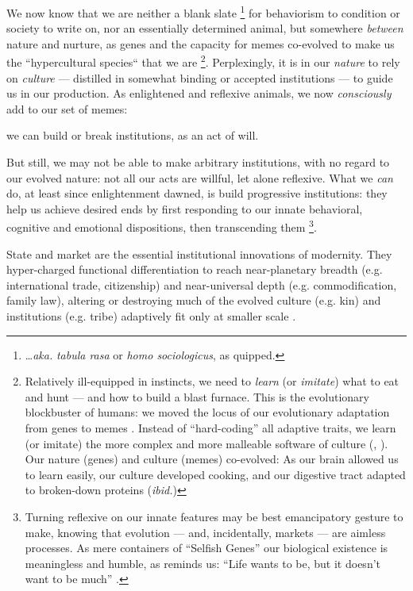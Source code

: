 \documentclass[11pt,a4paper,oneside,openright]{article}
\begin{document}
\begin{enumerate}
	We now know that we are neither a blank slate
		\footnote{
			\ldots \emph{aka.} \emph{tabula rasa} or \emph{homo sociologicus}, as \cite{Dahrendorf1965} quipped.
		} 
	for behaviorism to condition or society to write on, nor an essentially determined animal, but somewhere \emph{between} nature and nurture, as genes and the capacity for memes \citep{Dawkins1976} co-evolved to make us the ``hypercultural species`` that we are  \citep[loc 175]{Henrich2007}
	\footnote{
		Relatively ill-equipped in instincts, we need to \emph{learn} (or \emph{imitate}) what to eat and hunt --- and how to build a blast furnace. 
		This is the evolutionary blockbuster of humans: 
		we moved the locus of our evolutionary adaptation from genes to memes \citep{Dawkins1976}. 
		Instead of ``hard-coding'' all adaptive traits, we learn (or imitate) the more complex and more malleable software of culture (\citealt{Boyd1985}, \citealt[K 196ff]{Henrich2007}). 
		Our nature (genes) and culture (memes) co-evolved: 
		As our brain allowed us to learn easily, our culture developed cooking, and our digestive tract adapted to broken-down proteins (\emph{ibid.})
	}. 
	Perplexingly, it is in our \emph{nature} to rely on \emph{culture}  --- distilled in somewhat binding or accepted institutions --- to guide us in our production. 
	As enlightened and reflexive animals, we now \emph{consciously} add to our set of memes: 
	
	we can build or break institutions, as an act of will. 
	
	But still, we may not be able to make arbitrary institutions, with no regard to our evolved nature: 
	not all our acts are willful, let alone reflexive. 
	What we \emph{can} do, at least since enlightenment dawned, is build progressive institutions: 
	they help us achieve desired ends by first responding to our innate behavioral, cognitive and emotional dispositions, then transcending them
		\footnote{
			Turning reflexive on our innate features may be best emancipatory gesture to make, knowing that evolution --- and, incidentally, markets --- are aimless processes. 
			As mere containers of ``Selfish Genes'' \citep{Dawkins1976} our biological existence is meaningless and humble, as \citeauthor{Bryson2003} reminds us: 
			``Life wants to be, but it doesn't want to be much'' \citeyearpar{Bryson2003}.
		}.
	
	State and market are the essential institutional innovations of modernity. 
	They hyper-charged functional differentiation to reach near-planetary breadth (e.g. international trade, citizenship) and near-universal depth (e.g. commodification, family law), altering or destroying much of the evolved culture (e.g. kin) and institutions (e.g. tribe) adaptively fit only at smaller scale \citep{Diamond1997}. 
	

\end{enumerate}
\end{document}

